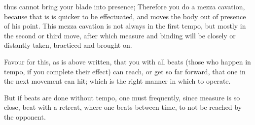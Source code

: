 \newpage


\newpage


thus cannot bring your blade into presence; Therefore you do a mezza
cavation, because that is is quicker to be effectuated, and moves the
body out of presence of his point. This mezza cavation is not always
in the first tempo, but mostly in the second or third move, after
which measure and binding will be closely or distantly taken,
bracticed and brought on.


Favour for this, as is above written, that you with all beats (those
who happen in tempo, if you complete their effect) can reach, or get
so far forward, that one in the next movement can hit; which is the
right manner in which to operate.


But if beats are done without tempo, one must frequently, since
measure is so close, beat with a retreat, where one beats between
time, to not be reached by the opponent.

